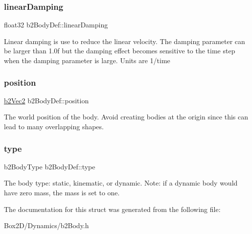 \subsubsection{\texorpdfstring{linear\+Damping}{linearDamping}}
{\footnotesize\ttfamily float32 b2\+Body\+Def\+::linear\+Damping}

Linear damping is use to reduce the linear velocity. The damping parameter can be larger than 1.\+0f but the damping effect becomes sensitive to the time step when the damping parameter is large. Units are 1/time \mbox{\label{structb2_body_def_a680cadc09ad6cf4b3366cbf0914c648b}} 
\subsubsection{\texorpdfstring{position}{position}}
{\footnotesize\ttfamily \hyperlink{structb2_vec2}{b2\+Vec2} b2\+Body\+Def\+::position}

The world position of the body. Avoid creating bodies at the origin since this can lead to many overlapping shapes. \mbox{\label{structb2_body_def_a89cc3ad1873908042b002147b3861381}} 
\subsubsection{\texorpdfstring{type}{type}}
{\footnotesize\ttfamily b2\+Body\+Type b2\+Body\+Def\+::type}

The body type\+: static, kinematic, or dynamic. Note\+: if a dynamic body would have zero mass, the mass is set to one. 

The documentation for this struct was generated from the following file\+:\begin{DoxyCompactItemize}
\item 
Box2\+D/\+Dynamics/b2\+Body.\+h\end{DoxyCompactItemize}
